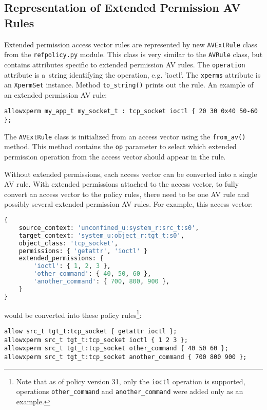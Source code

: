 \subsection{Representation of Extended Permission AV Rules}
Extended permission access vector rules are represented by new
\texttt{AVExtRule} class from the \texttt{refpolicy.py} module. This class is
very similar to the \texttt{AVRule} class, but contains attributes specific to
extended permission AV rules. The \texttt{operation} attribute is a~string
identifying the operation, e.g. 'ioctl'. The \texttt{xperms} attribute is an
\texttt{XpermSet} instance. Method \texttt{to\_string()} prints out the rule.
An example of an extended permission AV rule:
\begin{lstlisting}
allowxperm my_app_t my_socket_t : tcp_socket ioctl { 20 30 0x40 50-60 };
\end{lstlisting}

The \texttt{AVExtRule} class is initialized from an access vector using the
\texttt{from\_av()} method. This method contains the \texttt{op} parameter to
select which extended permission operation from the access vector should appear
in the rule.

Without extended permissions, each access vector can be converted into a single
AV rule. With extended permissions attached to the access vector, to fully
convert an access vector to the policy rules, there need to be one AV rule and
possibly several extended permission AV rules. For example, this access vector:

\pagebreak

\begin{lstlisting}[language=Python]
{
    source_context: 'unconfined_u:system_r:src_t:s0',
    target_context: 'system_u:object_r:tgt_t:s0',
    object_class: 'tcp_socket',
    permissions: { 'getattr', 'ioctl' }
    extended_permissions: {
        'ioctl': { 1, 2, 3 },
        'other_command': { 40, 50, 60 },
        'another_command': { 700, 800, 900 },
    }
}
\end{lstlisting}
would be converted into these policy rules\footnote{Note that as of policy
version 31, only the \texttt{ioctl} operation is supported, operations
\texttt{other\_command} and \texttt{another\_command} were added only as an
example.}:
\begin{lstlisting}
allow src_t tgt_t:tcp_socket { getattr ioctl };
allowxperm src_t tgt_t:tcp_socket ioctl { 1 2 3 };
allowxperm src_t tgt_t:tcp_socket other_command { 40 50 60 };
allowxperm src_t tgt_t:tcp_socket another_command { 700 800 900 };
\end{lstlisting}

